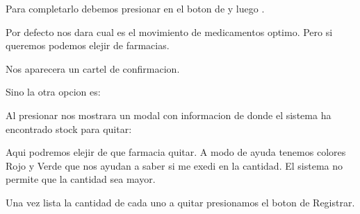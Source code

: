 \documentclass[a4paper,10pt,spanish]{sphinxmanual}
\begin{document}

Para completarlo debemos presionar en el boton de  y luego .


Por defecto nos dara cual es el movimiento de medicamentos optimo. Pero si queremos podemos elejir de farmacias.


Nos aparecera un cartel de confirmacion.


Sino la otra opcion es:


Al presionar nos mostrara un modal con informacion de donde el sistema ha encontrado stock para quitar:


Aqui podremos elejir de que farmacia quitar. A modo de ayuda tenemos colores Rojo y Verde que nos ayudan a saber si me exedi en la cantidad.
El sistema no permite que la cantidad sea mayor.



Una vez lista la cantidad de cada uno a quitar presionamos el boton de Registrar.
\end{document}
